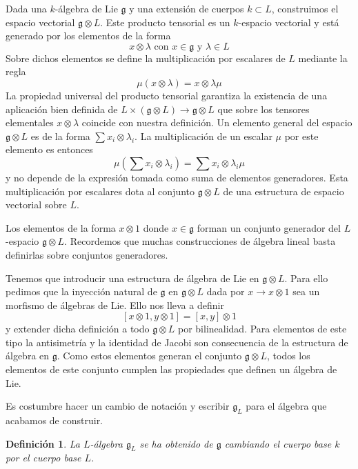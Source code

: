 \documentclass[a4paper,draft,12pt]{scrartcl}
\newtheorem{defi}{Definición}[section]%
\begin{document}
Dada una $k$-álgebra de Lie $\mathfrak{g}$ y una extensión de cuerpos $k \subset L$, construimos el espacio vectorial $\mathfrak{g}\otimes L$.  Este producto tensorial es un $k$-espacio vectorial y está generado por los elementos de la forma
$$
x \otimes \lambda \text{ con } x \in \mathfrak{g} \text{ y } \lambda \in L
$$
Sobre dichos elementos se define la multiplicación por escalares de $L$ mediante la regla
$$
\mu(x \otimes \lambda) = x \otimes \lambda \mu
$$
La propiedad universal del producto tensorial garantiza la existencia de una aplicación bien definida de $L \times (\mathfrak{g}\otimes L) \rightarrow \mathfrak{g}\otimes L$
que sobre los tensores elementales $x \otimes \lambda$ coincide con nuestra definición.  Un elemento general del espacio $\mathfrak{g} \otimes L$ es de la forma $\sum x_i \otimes \lambda_i$.  La multiplicación de un escalar $\mu$ por este elemento es entonces
$$
\mu(\sum x_i \otimes \lambda_i) = \sum x_i \otimes \lambda_i \mu
$$
y no depende de la expresión tomada como suma de elementos generadores.  Esta multiplicación por escalares dota al conjunto $\mathfrak{g}\otimes L$ de una estructura de espacio vectorial sobre $L$.

\bigskip


Los elementos de la forma $x\otimes 1$ donde $x \in \mathfrak{g}$ forman un conjunto generador del $L$-espacio $\mathfrak{g}\otimes L$.  Recordemos que muchas construcciones de álgebra lineal basta definirlas sobre conjuntos generadores.

\bigskip

Tenemos que introducir una estructura de álgebra de Lie en $\mathfrak{g}\otimes L$. Para ello pedimos que la inyección natural de $\mathfrak{g}$ en  $\mathfrak{g} \otimes L$ dada por $x\rightarrow x\otimes 1$ sea un morfismo de álgebras de Lie.  Ello nos lleva a definir
$$
[x \otimes 1, y\otimes 1]= [x,y]\otimes 1
$$
y extender dicha definición a todo $\mathfrak{g} \otimes L$ por bilinealidad.  Para elementos de este tipo la antisimetría y la identidad de Jacobi son consecuencia de la estructura de álgebra en $\mathfrak{g}$.  Como estos elementos generan el conjunto $\mathfrak{g}\otimes L$, todos los elementos de este conjunto cumplen las propiedades que definen un álgebra de Lie.

Es costumbre hacer un cambio de notación  y escribir $\mathfrak{g}_L$ para el álgebra que acabamos de construir.

\begin{defi}

La $L$-álgebra $\mathfrak{g}_L$ se ha obtenido de $\mathfrak{g}$ cambiando el cuerpo base $k$ por el cuerpo base $L$.

\end{defi}
\end{document}
